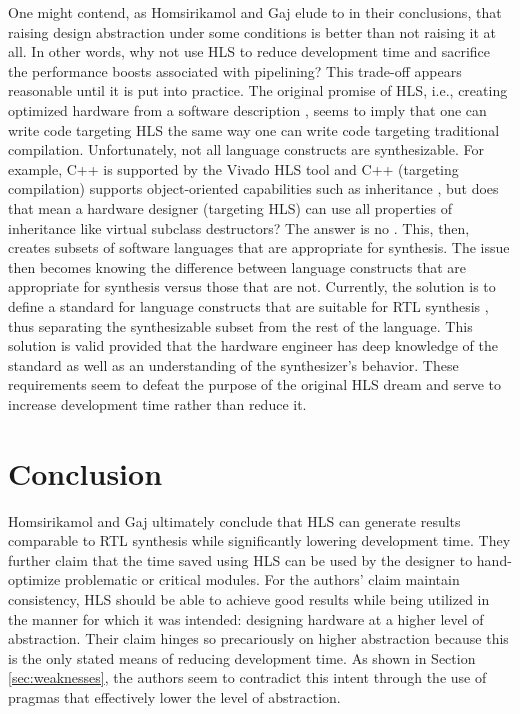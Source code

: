 \documentclass[12pt,journal,compsoc,onecolumn]{IEEEtran}
\begin{document}
One might contend, as Homsirikamol and Gaj elude to in their conclusions, that raising design abstraction under some conditions is better than not raising it at all. In other words, why not use HLS to reduce development time and sacrifice the performance boosts associated with pipelining? This trade-off appears reasonable until it is put into practice. The original promise of HLS, i.e., creating optimized hardware from a software description \cite{3}, seems to imply that one can write code targeting HLS the same way one can write code targeting traditional compilation. Unfortunately, not all language constructs are synthesizable. For example, C++ is supported by the Vivado HLS tool \cite{vivado} and C++ (targeting compilation) supports object-oriented capabilities such as inheritance \cite{c++datamodel}, but does that mean a hardware designer (targeting HLS) can use all properties of inheritance like virtual subclass destructors? The answer is no \cite{c++hls}. This, then, creates subsets of software languages that are appropriate for synthesis. The issue then becomes knowing the difference between language constructs that are appropriate for synthesis versus those that are not. Currently, the solution is to define a standard for language constructs that are suitable for RTL synthesis \cite{ieeeverilog}, thus separating the synthesizable subset from the rest of the language. This solution is valid provided that the hardware engineer has deep knowledge of the standard as well as an understanding of the synthesizer's behavior. These requirements seem to defeat the purpose of the original HLS dream and serve to increase development time rather than reduce it.

\section{Conclusion}
Homsirikamol and Gaj ultimately conclude that HLS can generate results comparable to RTL synthesis while significantly lowering development time. They further claim that the time saved using HLS can be used by the designer to hand-optimize problematic or critical modules. For the authors' claim maintain consistency, HLS should be able to achieve good results while being utilized in the manner for which it was intended: designing hardware at a higher level of abstraction. Their claim hinges so precariously on higher abstraction because this is the only stated means of reducing development time. As shown in Section \ref{sec:weaknesses}, the authors seem to contradict this intent through the use of pragmas that effectively lower the level of abstraction. 
\end{document}
